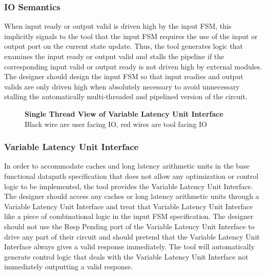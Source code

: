 \subsubsection{IO Semantics}
When input ready or output valid is driven high by the input FSM, this implicitly signals to the tool that the input FSM requires the use of the input or output port on the current state update. Thus, the tool generates logic that examines the input ready or output valid and stalls the pipeline if the corresponding input valid or output ready is not driven high by external modules. The designer should design the input FSM so that input readies and output valids are only driven high when absolutely necessary to avoid unnecessary stalling the automatically multi-threaded and pipelined version of the circuit.

\begin{figure}
	\centering
    \caption{{\bf Single Thread View of Variable Latency Unit Interface} Black wire are user facing IO, red wires are tool facing IO}
	\label{fig:VarLatIO}
\end{figure}

\subsubsection{Variable Latency Unit Interface}
In order to accommodate caches and long latency arithmetic units in the base functional datapath specification that does not allow any optimization or control logic to be implemented, the tool provides the Variable Latency Unit Interface. The designer should access any caches or long latency arithmetic units through a Variable Latency Unit Interface and treat that Variable Latency Unit Interface like a piece of combinational logic in the input FSM specification. The designer should not use the Resp Pending port of the Variable Latency Unit Interface to drive any part of their circuit and should pretend that the Variable Latency Unit Interface always gives a valid response immediately. The tool will automatically generate control logic that deals with the Variable Latency Unit Interface not immediately outputting a valid response.

